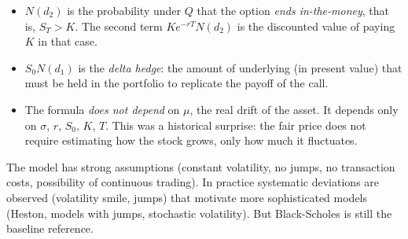 \documentclass[11pt, a4paper]{article}
\begin{document}
\begin{itemize}
    \item $N(d_2)$ is the probability under $Q$ that the option \emph{ends in-the-money}, that
    is, $S_T > K$. The second term $K e^{-rT} N(d_2)$ is the discounted value of paying $K$
    in that case.
    \item $S_0 N(d_1)$ is the \emph{delta hedge}: the amount of underlying (in present value)
    that must be held in the portfolio to replicate the payoff of the call.
    \item The formula \emph{does not depend} on $\mu$, the real drift of the asset. It depends only on
    $\sigma$, $r$, $S_0$, $K$, $T$. This was a historical surprise: the fair price does not require
    estimating how the stock grows, only how much it fluctuates.
\end{itemize}

\obs The model has strong assumptions (constant volatility, no jumps, no transaction
costs, possibility of continuous trading). In practice systematic deviations are observed
(volatility smile, jumps) that motivate more sophisticated models (Heston, models with
jumps, stochastic volatility). But Black-Scholes is still the baseline reference.
\end{document}
